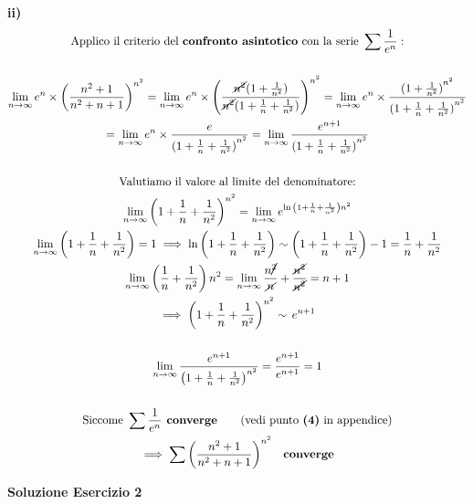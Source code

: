 \documentclass[11pt,reqno]{amsart}
\begin{document}
{\bf ii)}
\begin{gather*}
  \text{Applico il criterio del } \textbf{confronto asintotico} \text{ con la serie } \sum \frac{1}{e^n}:\\\\
  \lim_{n \to \infty} e^n \times {\left({\frac{n^2+1}{n^2+n+1}}\right)}^{n^2} = \lim_{n \to \infty} e^n \times {\left(\frac{\cancel{n^2}(1+\frac{1}{n^2})}{\cancel{n^2}(1+\frac{1}{n}+\frac{1}{n^2})}\right)}^{n^2} = \lim_{n \to \infty} e^n \times \frac{{(1+\frac{1}{n^2})}^{n^2}}{{(1+\frac{1}{n}+\frac{1}{n^2})}^{n^2}}\\
  = \lim_{n \to \infty} e^n \times \frac{e}{{(1+\frac{1}{n}+\frac{1}{n^2})}^{n^2}} = \lim_{n \to \infty} \frac{e^{n+1}}{{(1+\frac{1}{n}+\frac{1}{n^2})}^{n^2}}\\\\
  \text{Valutiamo il valore al limite del denominatore:}\\
  \lim_{n \to \infty}{\left(1+\frac{1}{n}+\frac{1}{n^2}\right)}^{n^2} = \lim_{n \to \infty} e^{\ln{\left(1+\frac{1}{n}+\frac{1}{n^2}\right)}{n^2}}\\
  \lim_{n \to \infty} \left(1+\frac{1}{n}+\frac{1}{n^2}\right) = 1 \implies \ln{\left(1+\frac{1}{n}+\frac{1}{n^2}\right)} \sim \left(1+\frac{1}{n}+\frac{1}{n^2}\right) - 1 = \frac{1}{n}+\frac{1}{n^2}\\
  \lim_{n \to \infty} {\left(\frac{1}{n}+\frac{1}{n^2}\right)n^2} = \lim_{n \to \infty} {\frac{n{\cancel{^2}}}{\cancel{n}}+\frac{\cancel{n^2}}{\cancel{n^2}}} = n + 1\\
  \implies {\left(1+\frac{1}{n}+\frac{1}{n^2}\right)}^{n^2} \sim \, e^{n + 1}\\\\
  \lim_{n \to \infty} \frac{e^{n+1}}{{\left(1+\frac{1}{n}+\frac{1}{n^2}\right)}^{n^2}} = \frac{e^{n+1}}{e^{n+1}} = 1\\\\
  \text{Siccome } \sum \frac{1}{e^n} \textbf{ converge} \quad \quad \text{(vedi punto } \textbf{(4)} \text{ in appendice)}\\
  \implies \sum {\left({\frac{n^2+1}{n^2+n+1}}\right)}^{n^2} \quad \textbf{converge}
\end{gather*}

\newpage
\centerline{\bf Soluzione Esercizio 2 }
\bigskip
\end{document}
